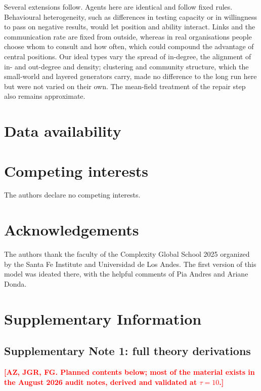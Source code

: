 \documentclass[11pt]{article}
\newcommand{\todo}[1]{\textcolor{red}{\textbf{[#1]}}}
\begin{document}
Several extensions follow. Agents here are identical and follow fixed rules. Behavioural heterogeneity, such as differences in testing capacity or in willingness to pass on negative results, would let position and ability interact. Links and the communication rate are fixed from outside, whereas in real organisations people choose whom to consult and how often, which could compound the advantage of central positions. Our ideal types vary the spread of in-degree, the alignment of in- and out-degree and density; clustering and community structure, which the small-world and layered generators carry, made no difference to the long run here but were not varied on their own. The mean-field treatment of the repair step also remains approximate.


\section*{Data availability}



\section*{Competing interests}
The authors declare no competing interests.

\section*{Acknowledgements}
The authors thank the faculty of the Complexity Global School 2025 organized by the Santa Fe Institute and Universidad de Los Andes. The first version of this model was ideated there, with the helpful comments of Pia Andres and Ariane Donda. 

\printbibliography


\clearpage
\section*{Supplementary Information}

\subsection*{Supplementary Note 1: full theory derivations}

\todo{AZ, JGR, FG. Planned contents below; most of the material exists in the August 2026 audit notes, derived and validated at $\tau = 10$.}
\end{document}
